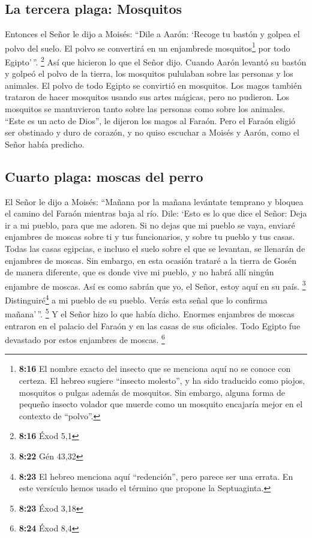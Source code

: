 \hypertarget{la-tercera-plaga-mosquitos}{%
\subsection{La tercera plaga:
Mosquitos}\label{la-tercera-plaga-mosquitos}}

 Entonces el Señor le dijo a Moisés: ``Dile a Aarón:
`Recoge tu bastón y golpea el polvo del suelo. El polvo se convertirá en
un enjambrede mosquitos\footnote{\textbf{8:16} El nombre exacto del
  insecto que se menciona aquí no se conoce con certeza. El hebreo
  sugiere ``insecto molesto'', y ha sido traducido como piojos,
  mosquitos o pulgas además de mosquitos. Sin embargo, alguna forma de
  pequeño insecto volador que muerde como un mosquito encajaría mejor en
  el contexto de ``polvo''.} por todo Egipto'\,''. \footnote{\textbf{8:16}
  Éxod 5,1}  Así que hicieron lo que el Señor dijo.
Cuando Aarón levantó su bastón y golpeó el polvo de la tierra, los
mosquitos pululaban sobre las personas y los animales. El polvo de todo
Egipto se convirtió en mosquitos.  Los magos también
trataron de hacer mosquitos usando sus artes mágicas, pero no pudieron.
Los mosquitos se mantuvieron tanto sobre las personas como sobre los
animales.  ``Este es un acto de Dios'', le dijeron los
magos al Faraón. Pero el Faraón eligió ser obstinado y duro de corazón,
y no quiso escuchar a Moisés y Aarón, como el Señor había predicho.

\hypertarget{cuarto-plaga-moscas-del-perro}{%
\subsection{Cuarto plaga: moscas del
perro}\label{cuarto-plaga-moscas-del-perro}}

 El Señor le dijo a Moisés: ``Mañana por la mañana
levántate temprano y bloquea el camino del Faraón mientras baja al río.
Dile: `Esto es lo que dice el Señor: Deja ir a mi pueblo, para que me
adoren.  Si no dejas que mi pueblo se vaya, enviaré
enjambres de moscas sobre ti y tus funcionarios, y sobre tu pueblo y tus
casas. Todas las casas egipcias, e incluso el suelo sobre el que se
levantan, se llenarán de enjambres de moscas.  Sin
embargo, en esta ocasión trataré a la tierra de Gosén de manera
diferente, que es donde vive mi pueblo, y no habrá allí ningún enjambre
de moscas. Así es como sabrán que yo, el Señor, estoy aquí en su país.
\footnote{\textbf{8:22} Gén 43,32} 
Distinguiré\footnote{\textbf{8:23} El hebreo menciona aquí
  ``redención'', pero parece ser una errata. En este versículo hemos
  usado el término que propone la Septuaginta.} a mi pueblo de su
pueblo. Verás esta señal que lo confirma mañana'\,''. \footnote{\textbf{8:23}
  Éxod 3,18}  Y el Señor hizo lo que había dicho. Enormes
enjambres de moscas entraron en el palacio del Faraón y en las casas de
sus oficiales. Todo Egipto fue devastado por estos enjambres de moscas.
\footnote{\textbf{8:24} Éxod 8,4}

